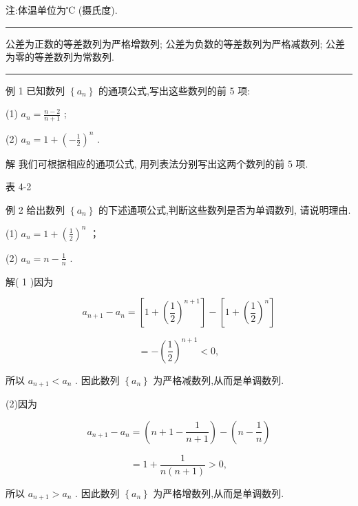 \documentclass[10pt]{article}
\newcommand{\HRule}{\begin{center}\rule{0.9\linewidth}{0.2mm}\end{center}}
\begin{document}
注:体温单位为℃ (摄氏度).

\HRule

公差为正数的等差数列为严格增数列; 公差为负数的等差数列为严格减数列; 公差为零的等差数列为常数列.

\HRule

例 1 已知数列 \(\left\{  {a}_{n}\right\}\) 的通项公式,写出这些数列的前 5 项:

(1) \({a}_{n} = \frac{n - 2}{n + 1}\) ;

(2) \({a}_{n} = 1 + {\left( -\frac{1}{2}\right) }^{n}\) .

解 我们可根据相应的通项公式, 用列表法分别写出这两个数列的前 5 项.

表 4-2

\begin{center}
\end{center}

例 2 给出数列 \(\left\{  {a}_{n}\right\}\) 的下述通项公式,判断这些数列是否为单调数列, 请说明理由.

(1) \({a}_{n} = 1 + {\left( \frac{1}{2}\right) }^{n}\) ；

(2) \({a}_{n} = n - \frac{1}{n}\) .

解( 1 )因为

\[
{a}_{n + 1} - {a}_{n} = \left\lbrack  {1 + {\left( \frac{1}{2}\right) }^{n + 1}}\right\rbrack   - \left\lbrack  {1 + {\left( \frac{1}{2}\right) }^{n}}\right\rbrack
\]

\[
=  - {\left( \frac{1}{2}\right) }^{n + 1} < 0,
\]

所以 \({a}_{n + 1} < {a}_{n}\) . 因此数列 \(\left\{  {a}_{n}\right\}\) 为严格减数列,从而是单调数列.

(2)因为

\[
{a}_{n + 1} - {a}_{n} = \left( {n + 1 - \frac{1}{n + 1}}\right)  - \left( {n - \frac{1}{n}}\right)
\]

\[
= 1 + \frac{1}{n\left( {n + 1}\right) } > 0,
\]

所以 \({a}_{n + 1} > {a}_{n}\) . 因此数列 \(\left\{  {a}_{n}\right\}\) 为严格增数列,从而是单调数列.
\end{document}
